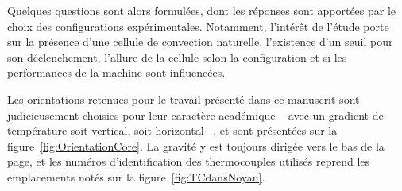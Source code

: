 Quelques questions sont alors formulées, dont les réponses sont apportées par le choix des configurations expérimentales. Notamment, l'intérêt de l'étude porte sur la présence d'une cellule de convection naturelle, l'existence d'un seuil pour son déclenchement, l'allure de la cellule selon la configuration et si les performances de la machine sont influencées.  


Les orientations retenues pour le travail présenté dans ce manuscrit sont judicieusement choisies pour leur caractère académique -- avec un gradient de température soit vertical, soit horizontal --, et sont présentées sur la figure~\ref{fig:OrientationCore}. La gravité y est toujours dirigée vers le bas de la page, et les numéros d'identification des thermocouples utilisés reprend les emplacements notés sur la figure~\ref{fig:TCdansNoyau}.\medskip

